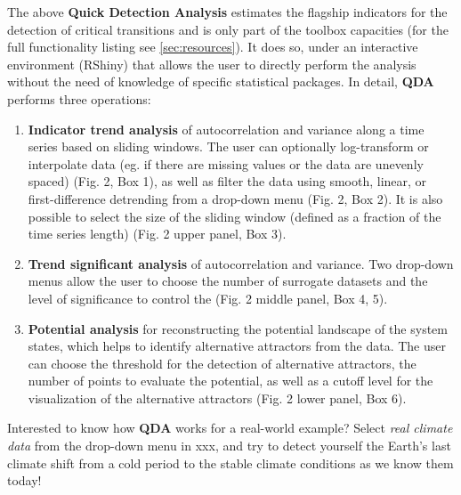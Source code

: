 \documentclass[12pt,a4paper,final]{article}
\begin{document}
\begin{doublespacing}
The above \textbf{Quick Detection Analysis} estimates the flagship indicators for the detection of critical transitions and is only part of the toolbox capacities (for the full functionality listing see \ref{sec:resources}). It does so, under an interactive environment (RShiny) that allows the user to directly perform the analysis without the need of knowledge of specific statistical packages.
In detail, \textbf{QDA} performs three operations:
\begin{enumerate}
\item \textbf{Indicator trend analysis} of autocorrelation and variance along a time series based on sliding windows. The user can optionally log-transform or interpolate data (eg. if there are missing values or the data are unevenly spaced) (Fig. 2, Box 1), as well as filter the data using smooth, linear, or first-difference detrending from a drop-down menu (Fig. 2, Box 2). It is also possible to select the size of the sliding window (defined as a fraction of the time series length) (Fig. 2 upper panel, Box 3).
\item \textbf{Trend significant analysis} of autocorrelation and variance. Two drop-down menus allow the user to choose the number of surrogate datasets and the level of significance to control the  (Fig. 2 middle panel, Box 4, 5). 
\item \textbf{Potential analysis} for reconstructing the potential landscape of the system states, which helps to identify alternative attractors from the data. The user can choose the threshold for the detection of alternative attractors, the number of points to evaluate the potential, as well as a cutoff level for the visualization of the alternative attractors (Fig. 2 lower panel, Box 6).
\end{enumerate}

Interested to know how \textbf{QDA} works for a real-world example? Select \textit{real climate data} from the drop-down menu in xxx, and try to detect yourself the Earth's last climate shift from a cold period to the stable climate conditions as we know them today!



\end{doublespacing}
\end{document}
